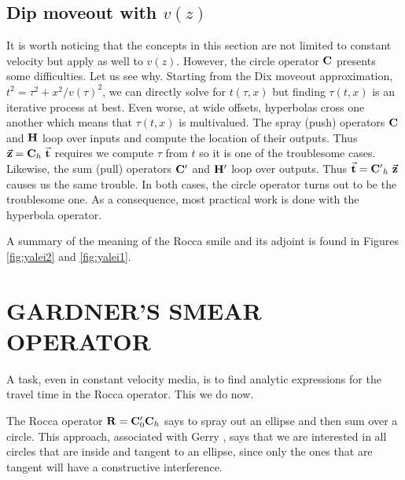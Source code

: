 \subsection{Dip moveout with $v(z)$}
It is worth noticing that the concepts in this section
are not limited to constant velocity
but apply as well to $v(z)$.
However,
the circle operator $\bold C$ presents some difficulties.
Let us see why.
Starting from the Dix moveout approximation,
$t^2 = \tau^2 + x^2/v(\tau )^2$,
we can directly solve for $t(\tau ,x)$
but finding $\tau (t,x)$ is an iterative process at best.
Even worse, at wide offsets, hyperbolas cross one another
which means that $\tau (t,x)$ is multivalued.
The spray (push)
operators $\bold C$ and $\bold H$ loop over inputs
and compute the location of their outputs.
Thus
$ \vec {\bold z} = \bold C_h\ \vec {\bold t}$
requires we compute $\tau$ from $t$ so it is
one of the troublesome cases.
Likewise, the sum (pull)
operators $\bold C'$ and $\bold H'$ loop over outputs.
Thus
$ \vec {\bold t} = {\bold C'}_h\ \vec {\bold z}$
causes us the same trouble.
In both cases, the circle operator
turns out to be the troublesome one.
As a consequence, most practical work is done with
the hyperbola operator.
\par
A summary of the meaning of the Rocca smile
and its adjoint is found in Figures
\ref{fig:yalei2} and \ref{fig:yalei1}.




\section{GARDNER'S SMEAR OPERATOR}
A task, even in constant velocity media,
is to find analytic expressions for the travel time
in the Rocca operator.
This we do now.

\par
The Rocca operator $ \bold R = \bold C'_0 \bold C_h$
says to spray out an ellipse and then sum over a circle.
This approach,
associated with Gerry ,
says that we are interested in all circles
that are inside and tangent to an ellipse,
since only the ones that are tangent
will have a constructive interference.

